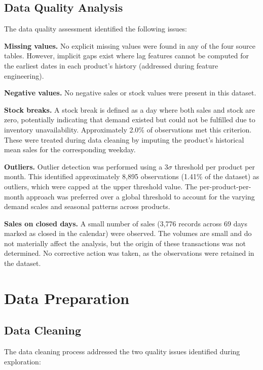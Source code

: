 \subsection{Data Quality Analysis}

The data quality assessment identified the following issues:

\textbf{Missing values.} No explicit missing values were found in any of the four source tables. However, implicit gaps exist where lag features cannot be computed for the earliest dates in each product's history (addressed during feature engineering).

\textbf{Negative values.} No negative sales or stock values were present in this dataset.

\textbf{Stock breaks.} A stock break is defined as a day where both sales and stock are zero, potentially indicating that demand existed but could not be fulfilled due to inventory unavailability. Approximately 2.0\% of observations met this criterion. These were treated during data cleaning by imputing the product's historical mean sales for the corresponding weekday.

\textbf{Outliers.} Outlier detection was performed using a 3$\sigma$ threshold per product per month. This identified approximately 8,895 observations (1.41\% of the dataset) as outliers, which were capped at the upper threshold value. The per-product-per-month approach was preferred over a global threshold to account for the varying demand scales and seasonal patterns across products.

\textbf{Sales on closed days.} A small number of sales (3,776 records across 69 days marked as closed in the calendar) were observed. The volumes are small and do not materially affect the analysis, but the origin of these transactions was not determined. No corrective action was taken, as the observations were retained in the dataset.


\clearpage
\section{Data Preparation}

\subsection{Data Cleaning}

The data cleaning process addressed the two quality issues identified during exploration:

